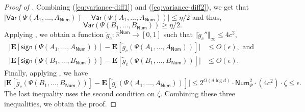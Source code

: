 \documentclass{toc}
\begin{document}
\begin{proof}[Proof of ]
Combining (\ref{eq:variance-diff1}) and (\ref{eq:variance-diff2}), we get that 
$
|\mathsf{Var}(\Psi(A_1, \ldots, A_{\mathsf{Num}})) - \mathsf{Var}(\Psi(A_1, \ldots, A_{\mathsf{Num}}))| \le \eta/2
$ and thus, $$\mathsf{Var}(\Psi(B_1, \ldots, B_{\mathsf{Num}})) \ge \eta/2.$$
Applying , we obtain a function
$\tilde{g}_c : \mathbb{R}^{\mathsf{Num}} \rightarrow [0,1]$ such that
$\Vert \tilde{g}_c'' \Vert_{\infty} \le 4c^2$,
\begin{align*}
    \big|\mathbf{E} [ \mathsf{sign}(\Psi(A_1, \ldots, A_{\mathsf{Num}}))]  - \mathbf{E} [ \tilde{g}_c(\Psi(A_1, \ldots, A_{\mathsf{Num}}))] \big| &\le O(\epsilon), \text{ and } \\
    \big|\mathbf{E} [ \mathsf{sign}(\Psi(B_1, \ldots, B_{\mathsf{Num}}))]  - \mathbf{E} [ \tilde{g}_c(\Psi(B_1, \ldots, B_{\mathsf{Num}}))] \big| &\le O(\epsilon).
\end{align*}
Finally, applying , we have 
\[
\big| \mathbf{E} [ \tilde{g}_c(\Psi(B_1, \ldots, B_{\mathsf{Num}}))]- \mathbf{E} [ \tilde{g}_c(\Psi(A_1, \ldots, A_{\mathsf{Num}}))] \big| \le 2^{O(d \log d)} \cdot \mathsf{Num}_\Psi^2 \cdot (4c^2) \cdot \zeta \le \epsilon.
\]
The last inequality uses the second condition on $\zeta$.  Combining these three inequalities, we obtain the proof. 
\end{proof}
\end{document}
